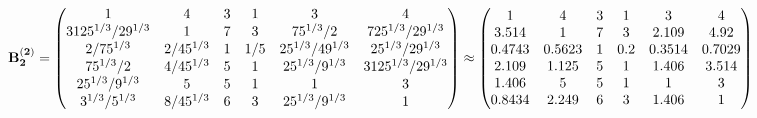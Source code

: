 \documentclass[10pt,a4paper]{article}
\begin{document}
	\[
		\bold{B_2^{(2)}} = 
		\begin{pmatrix}
			{1}{} & {{4}}{} & {{3}}{} & {1}{} & {{3}}{} & {{4}}{} \\
			{{3125^ {1 / 3}}} / {{2}{9^ {1 / 3}}} & {1}{} & {{7}}{} & {{3}}{} & {{75^ {1 / 3}}} / {{2}} & {{7}{25^ {1 / 3}}} / {{2}{9^ {1 / 3}}} \\
			{{2}} / {{75^ {1 / 3}}} & {{2}} / {{45^ {1 / 3}}} & {1}{} & {1} / {{5}} & {{25^ {1 / 3}}} / {{4}{9^ {1 / 3}}} & {{25^ {1 / 3}}} / {{2}{9^ {1 / 3}}} \\
			{{75^ {1 / 3}}} / {{2}} & {{4}} / {{45^ {1 / 3}}} & {{5}}{} & {1}{} & {{25^ {1 / 3}}} / {{9^ {1 / 3}}} & {{3125^ {1 / 3}}} / {{2}{9^ {1 / 3}}} \\
			{{25^ {1 / 3}}} / {{9^ {1 / 3}}} & {{5}}{} & {{5}}{} & {1}{} & {1}{} & {{3}}{} \\
			{{3^ {1 / 3}}} / {{5^ {1 / 3}}} & {{8}} / {{45^ {1 / 3}}} & {{6}}{} & {{3}}{} & {{25^ {1 / 3}}} / {{9^ {1 / 3}}} & {1}{} \\
		\end{pmatrix}
		\approx
		\begin{pmatrix}
			1        & 4        & 3        & 1        & 3        & 4        \\
			3.514    & 1        & 7        & 3        & 2.109    & 4.92     \\
			0.4743   & 0.5623   & 1        & 0.2      & 0.3514   & 0.7029   \\
			2.109    & 1.125    & 5        & 1        & 1.406    & 3.514    \\
			1.406    & 5        & 5        & 1        & 1        & 3        \\
			0.8434   & 2.249    & 6        & 3        & 1.406    & 1        \\
		\end{pmatrix}
	\]
\end{document}
